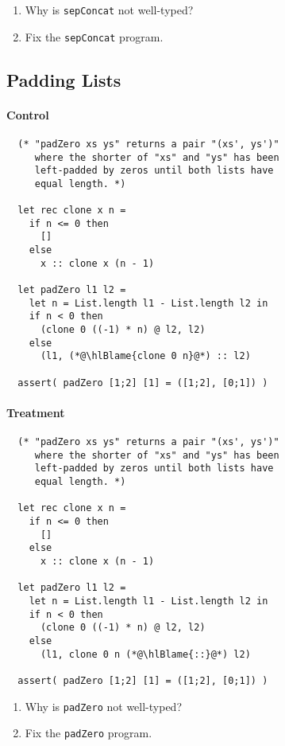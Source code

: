 \documentclass{article}
\newcommand\hlBlame[1]{\colorbox{red!25}{#1}}
\begin{document}
\begin{enumerate}
\item Why is \verb!sepConcat! not well-typed?
\item Fix the \verb!sepConcat! program.
\end{enumerate}

\subsection{Padding Lists}

\paragraph{Control}
\begin{lstlisting}
  (* "padZero xs ys" returns a pair "(xs', ys')"
     where the shorter of "xs" and "ys" has been
     left-padded by zeros until both lists have
     equal length. *)

  let rec clone x n =
    if n <= 0 then
      []
    else
      x :: clone x (n - 1)

  let padZero l1 l2 =
    let n = List.length l1 - List.length l2 in
    if n < 0 then
      (clone 0 ((-1) * n) @ l2, l2)
    else
      (l1, (*@\hlBlame{clone 0 n}@*) :: l2)

  assert( padZero [1;2] [1] = ([1;2], [0;1]) )
\end{lstlisting}

\paragraph{Treatment}
\begin{lstlisting}
  (* "padZero xs ys" returns a pair "(xs', ys')"
     where the shorter of "xs" and "ys" has been
     left-padded by zeros until both lists have
     equal length. *)

  let rec clone x n =
    if n <= 0 then
      []
    else
      x :: clone x (n - 1)

  let padZero l1 l2 =
    let n = List.length l1 - List.length l2 in
    if n < 0 then
      (clone 0 ((-1) * n) @ l2, l2)
    else
      (l1, clone 0 n (*@\hlBlame{::}@*) l2)

  assert( padZero [1;2] [1] = ([1;2], [0;1]) )
\end{lstlisting}

\begin{enumerate}
\item Why is \verb!padZero! not well-typed?
\item Fix the \verb!padZero! program.
\end{enumerate}
\end{document}
